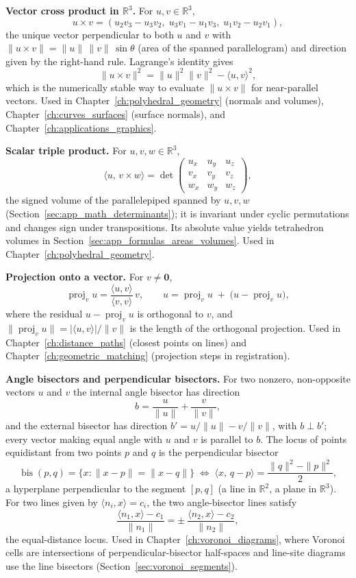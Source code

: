 \medskip\noindent\textbf{Vector cross product in $\mathbb{R}^3$.}
For $u, v \in \mathbb{R}^3$,
\[
  u\times v = (u_2 v_3 - u_3 v_2,\; u_3 v_1 - u_1 v_3,\; u_1 v_2 - u_2 v_1),
\]
the unique vector perpendicular to both $u$ and $v$ with
$\|u\times v\| = \|u\|\,\|v\|\,\sin\theta$ (area of the spanned
parallelogram) and direction given by the right-hand rule. Lagrange's
identity gives
\[
  \|u\times v\|^2 = \|u\|^2\|v\|^2 - \langle u,v\rangle^2,
\]
which is the numerically stable way to evaluate $\|u\times v\|$ for
near-parallel vectors. Used in Chapter~\ref{ch:polyhedral_geometry}
(normals and volumes), Chapter~\ref{ch:curves_surfaces} (surface normals),
and Chapter~\ref{ch:applications_graphics}.

\medskip\noindent\textbf{Scalar triple product.}
For $u, v, w \in \mathbb{R}^3$,
\[
  \langle u,\, v\times w\rangle
  = \det\begin{pmatrix} u_x & u_y & u_z \\ v_x & v_y & v_z \\ w_x & w_y & w_z \end{pmatrix},
\]
the signed volume of the parallelepiped spanned by $u, v, w$
(Section~\ref{sec:app_math_determinants}); it is invariant under cyclic
permutations and changes sign under transpositions. Its absolute value
yields tetrahedron volumes in Section~\ref{sec:app_formulas_areas_volumes}.
Used in Chapter~\ref{ch:polyhedral_geometry}.

\medskip\noindent\textbf{Projection onto a vector.}
For $v \neq \mathbf{0}$,
\[
  \operatorname{proj}_v u = \frac{\langle u,v\rangle}{\langle v,v\rangle}\,v,
  \qquad
  u = \operatorname{proj}_v u \;+\; \bigl(u - \operatorname{proj}_v u\bigr),
\]
where the residual $u - \operatorname{proj}_v u$ is orthogonal to $v$, and
$\|\operatorname{proj}_v u\| = |\langle u,v\rangle| / \|v\|$ is the length
of the orthogonal projection. Used in Chapter~\ref{ch:distance_paths}
(closest points on lines) and Chapter~\ref{ch:geometric_matching}
(projection steps in registration).

\medskip\noindent\textbf{Angle bisectors and perpendicular bisectors.}
For two nonzero, non-opposite vectors $u$ and $v$ the internal angle
bisector has direction
\[
  b = \frac{u}{\|u\|} + \frac{v}{\|v\|},
\]
and the external bisector has direction
$b' = u/\|u\| - v/\|v\|$, with $b \perp b'$; every vector making equal
angle with $u$ and $v$ is parallel to $b$. The locus of points equidistant
from two points $p$ and $q$ is the perpendicular bisector
\[
  \operatorname{bis}(p,q) = \bigl\{ x : \|x-p\| = \|x-q\| \bigr\}
  \;\Longleftrightarrow\;
  \langle x,\, q-p\rangle = \frac{\|q\|^2 - \|p\|^2}{2},
\]
a hyperplane perpendicular to the segment $[p,q]$ (a line in $\mathbb{R}^2$,
a plane in $\mathbb{R}^3$). For two lines given by
$\langle n_i, x\rangle = c_i$, the two angle-bisector lines satisfy
\[
  \frac{\langle n_1, x\rangle - c_1}{\|n_1\|}
  = \pm\ \frac{\langle n_2, x\rangle - c_2}{\|n_2\|},
\]
the equal-distance locus. Used in Chapter~\ref{ch:voronoi_diagrams}, where
Voronoi cells are intersections of perpendicular-bisector half-spaces and
line-site diagrams use the line bisectors (Section~\ref{sec:voronoi_segments}).

